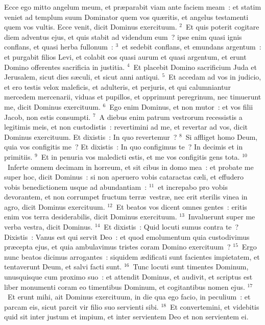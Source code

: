 \lettrine[lines=3,image=true,loversize=0.05,lraise=-0.03]{E}{}cce ego mitto angelum meum, et pr\ae parabit viam ante faciem meam~: et statim veniet ad templum suum Dominator quem vos qu\ae ritis, et angelus testamenti quem vos vultis. Ecce venit, dicit Dominus exercituum.
${}^{2}$~Et quis poterit cogitare diem adventus ejus, et quis stabit ad videndum eum~? ipse enim quasi ignis conflans, et quasi herba fullonum~:
${}^{3}$~et sedebit conflans, et emundans argentum~: et purgabit filios Levi, et colabit eos quasi aurum et quasi argentum, et erunt Domino offerentes sacrificia in justitia.
${}^{4}$~Et placebit Domino sacrificium Juda et Jerusalem, sicut dies s\ae culi, et sicut anni antiqui.
${}^{5}$~Et accedam ad vos in judicio, et ero testis velox maleficis, et adulteris, et perjuris, et qui calumniantur mercedem mercenarii, viduas et pupillos, et opprimunt peregrinum, nec timuerunt me, dicit Dominus exercituum.
${}^{6}$~Ego enim Dominus, et non mutor~: et vos filii Jacob, non estis consumpti.
${}^{7}$~A diebus enim patrum vestrorum recessistis a legitimis meis, et non custodistis~: revertimini ad me, et revertar ad vos, dicit Dominus exercituum. Et dixistis~: In quo revertemur~?
${}^{8}$~Si affliget homo Deum, quia vos configitis me~? Et dixistis~: In quo configimus te~? In decimis et in primitiis.
${}^{9}$~Et in penuria vos maledicti estis, et me vos configitis gens tota.
${}^{10}$~Inferte omnem decimam in horreum, et sit cibus in domo mea~: et probate me super hoc, dicit Dominus~: si non aperuero vobis cataractas c\ae li, et effudero vobis benedictionem usque ad abundantiam~:
${}^{11}$~et increpabo pro vobis devorantem, et non corrumpet fructum terr\ae\ vestr\ae , nec erit sterilis vinea in agro, dicit Dominus exercituum.
${}^{12}$~Et beatos vos dicent omnes gentes~: eritis enim vos terra desiderabilis, dicit Dominus exercituum.
${}^{13}$~Invaluerunt super me verba vestra, dicit Dominus.
${}^{14}$~Et dixistis~: Quid locuti sumus contra te~? Dixistis~: Vanus est qui servit Deo~: et quod emolumentum quia custodivimus pr\ae cepta ejus, et quia ambulavimus tristes coram Domino exercituum~?
${}^{15}$~Ergo nunc beatos dicimus arrogantes~: siquidem \ae dificati sunt facientes impietatem, et tentaverunt Deum, et salvi facti sunt.
${}^{16}$~Tunc locuti sunt timentes Dominum, unusquisque cum proximo suo~: et attendit Dominus, et audivit, et scriptus est liber monumenti coram eo timentibus Dominum, et cogitantibus nomen ejus.
${}^{17}$~Et erunt mihi, ait Dominus exercituum, in die qua ego facio, in peculium~: et parcam eis, sicut parcit vir filio suo servienti sibi.
${}^{18}$~Et convertemini, et videbitis quid sit inter justum et impium, et inter servientem Deo et non servientem ei.

